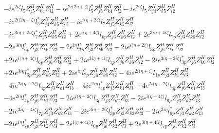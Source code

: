 \begin{align}
 &-i e^{2 i \zeta } l_5 Z_{{j 5}}^{H} Z_{{k 4}}^{H} Z_{{l 2}}^{H} -i e^{2 i \Big(2 \eta +\zeta \Big)} l_5^* Z_{{j 5}}^{H} Z_{{k 4}}^{H} Z_{{l 2}}^{H} -i e^{2 i \zeta } l_5 Z_{{j 4}}^{H} Z_{{k 5}}^{H} Z_{{l 2}}^{H} \nonumber \\ 
 &-i e^{2 i \Big(2 \eta +\zeta \Big)} l_5^* Z_{{j 4}}^{H} Z_{{k 5}}^{H} Z_{{l 2}}^{H} -i e^{i \Big(\eta +2 \zeta \Big)} l_7 Z_{{j 5}}^{H} Z_{{k 5}}^{H} Z_{{l 2}}^{H} \nonumber \\ 
 &-i e^{3 i \eta +2 i \zeta } l_7^* Z_{{j 5}}^{H} Z_{{k 5}}^{H} Z_{{l 2}}^{H} +2 e^{i \Big(\eta +4 \zeta \Big)} l_{6p} Z_{{j 3}}^{H} Z_{{k 6}}^{H} Z_{{l 2}}^{H} +2 e^{3 i \eta +4 i \zeta } l_{7p} Z_{{j 3}}^{H} Z_{{k 6}}^{H} Z_{{l 2}}^{H} \nonumber \\ 
 &-2 e^{3 i \eta } l_{6p}^* Z_{{j 3}}^{H} Z_{{k 6}}^{H} Z_{{l 2}}^{H} -2 e^{i \eta } l_{7p}^* Z_{{j 3}}^{H} Z_{{k 6}}^{H} Z_{{l 2}}^{H} -2 i e^{i \Big(\eta +2 \zeta \Big)} l_{3p} Z_{{j 6}}^{H} Z_{{k 6}}^{H} Z_{{l 2}}^{H} \nonumber \\ 
 &+2 i e^{i \Big(\eta +4 \zeta \Big)} l_{6p} Z_{{j 6}}^{H} Z_{{k 6}}^{H} Z_{{l 2}}^{H} +2 i e^{3 i \eta +4 i \zeta } l_{7p} Z_{{j 6}}^{H} Z_{{k 6}}^{H} Z_{{l 2}}^{H} -2 i e^{3 i \eta +2 i \zeta } l_{3p}^* Z_{{j 6}}^{H} Z_{{k 6}}^{H} Z_{{l 2}}^{H} \nonumber \\ 
 &+2 i e^{3 i \eta } l_{6p}^* Z_{{j 6}}^{H} Z_{{k 6}}^{H} Z_{{l 2}}^{H} +2 i e^{i \eta } l_{7p}^* Z_{{j 6}}^{H} Z_{{k 6}}^{H} Z_{{l 2}}^{H} -4 i e^{2 i \Big(\eta +\zeta \Big)} l_{1p} Z_{{j 3}}^{H} Z_{{k 1}}^{H} Z_{{l 3}}^{H} \nonumber \\ 
 &-4 i e^{2 i \Big(\eta +2 \zeta \Big)} l_{4p} Z_{{j 3}}^{H} Z_{{k 1}}^{H} Z_{{l 3}}^{H} -4 i e^{2 i \eta } l_{4p}^* Z_{{j 3}}^{H} Z_{{k 1}}^{H} Z_{{l 3}}^{H} +4 e^{2 i \Big(\eta +2 \zeta \Big)} l_{4p} Z_{{j 6}}^{H} Z_{{k 1}}^{H} Z_{{l 3}}^{H} \nonumber \\ 
 &-4 e^{2 i \eta } l_{4p}^* Z_{{j 6}}^{H} Z_{{k 1}}^{H} Z_{{l 3}}^{H} -2 i e^{i \Big(\eta +2 \zeta \Big)} l_{3p} Z_{{j 3}}^{H} Z_{{k 2}}^{H} Z_{{l 3}}^{H} -2 i e^{i \Big(\eta +4 \zeta \Big)} l_{6p} Z_{{j 3}}^{H} Z_{{k 2}}^{H} Z_{{l 3}}^{H} \nonumber \\ 
 &-2 i e^{3 i \eta +4 i \zeta } l_{7p} Z_{{j 3}}^{H} Z_{{k 2}}^{H} Z_{{l 3}}^{H} -2 i e^{3 i \eta +2 i \zeta } l_{3p}^* Z_{{j 3}}^{H} Z_{{k 2}}^{H} Z_{{l 3}}^{H} -2 i e^{3 i \eta } l_{6p}^* Z_{{j 3}}^{H} Z_{{k 2}}^{H} Z_{{l 3}}^{H} \nonumber \\ 
 &-2 i e^{i \eta } l_{7p}^* Z_{{j 3}}^{H} Z_{{k 2}}^{H} Z_{{l 3}}^{H} +2 e^{i \Big(\eta +4 \zeta \Big)} l_{6p} Z_{{j 6}}^{H} Z_{{k 2}}^{H} Z_{{l 3}}^{H} +2 e^{3 i \eta +4 i \zeta } l_{7p} Z_{{j 6}}^{H} Z_{{k 2}}^{H} Z_{{l 3}}^{H} \nonumber \\ 

\end{align}
